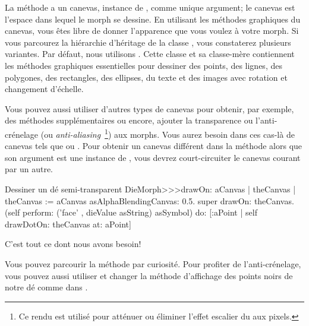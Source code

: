 \documentclass[a4paper,10pt,twoside]{book}
\begin{document}
La méthode  a un canevas, instance de
, comme unique argument;
le canevas est l'espace dans lequel le morph se dessine.
En utilisant les méthodes graphiques du canevas, vous êtes libre
de donner l'apparence que vous voulez \`a votre morph.
Si vous parcourez la hiérarchie d'héritage de la classe
, vous constaterez plusieurs variantes. Par défaut, nous
utilisons . Cette classe et sa classe-mère
 contiennent les méthodes graphiques essentielles pour
dessiner des points, des lignes, des polygones, des rectangles, des
ellipses, du texte et des images avec rotation et changement d'échelle. 

Vous pouvez aussi utiliser d'autres types de canevas pour obtenir, par
exemple, des méthodes supplémentaires ou encore, ajouter la
transparence ou l'anti-crénelage (ou
\emph{anti-aliasing}~\footnote{Ce rendu est utilisé pour atténuer
  ou éliminer l'effet escalier du aux pixels.}) aux morphs.  
Vous aurez besoin dans ces cas-l\`a de canevas tels que
 ou .
Pour obtenir un canevas différent dans la méthode 
alors que son argument est une instance de , vous devrez
court-circuiter le canevas courant par un autre. 


\begin{method}{Dessiner un dé semi-transparent}
DieMorph>>>drawOn: aCanvas
	| theCanvas |
	theCanvas := aCanvas asAlphaBlendingCanvas: 0.5.
	super drawOn: theCanvas.
	(self perform: ('face' , dieValue asString) asSymbol)
		do: [:aPoint | self drawDotOn: theCanvas at: aPoint]
\end{method}
\noindent

C'est tout ce dont nous avons besoin! 

Vous pouvez parcourir la méthode
 par curiosité.
Pour profiter de l'anti-crénelage, vous pouvez aussi utiliser
 et changer la méthode d'affichage des points
noirs de notre dé comme dans .
\end{document}
